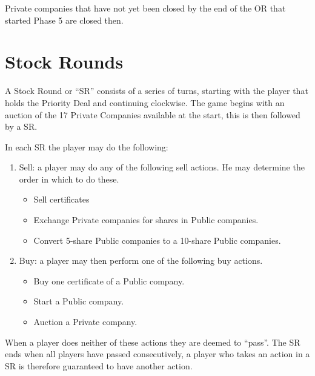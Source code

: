 \documentclass[a4paper]{article}
\begin{document}
Private companies that have not yet been closed by the end of the OR that
started Phase 5 are closed then.

\section{Stock Rounds}
A Stock Round or ``SR'' consists of a series of turns, starting with the player
that holds the Priority Deal and continuing clockwise. The game begins with an
auction of the 17 Private Companies available at the start, this is then
followed by a SR.

In each SR the player may do the following:
\begin{enumerate}
	\item Sell: a player may do any of the following sell actions. He may
	determine the order in which to do these.
	\begin{itemize}
		\item Sell certificates
		\item Exchange Private companies for shares in Public companies.
		\item Convert 5-share Public companies to a 10-share Public companies.
	\end{itemize}
	\item Buy: a player may then perform one of the following buy actions.
	\begin{itemize}
		\item Buy one certificate of a Public company.
		\item Start a Public company.
		\item Auction a Private company.
	\end{itemize}
\end{enumerate}

When a player does neither of these actions they are deemed to ``pass''. The
SR ends when all players have passed consecutively, a player who takes an action
in a SR is therefore guaranteed to have another action.
\end{document}
